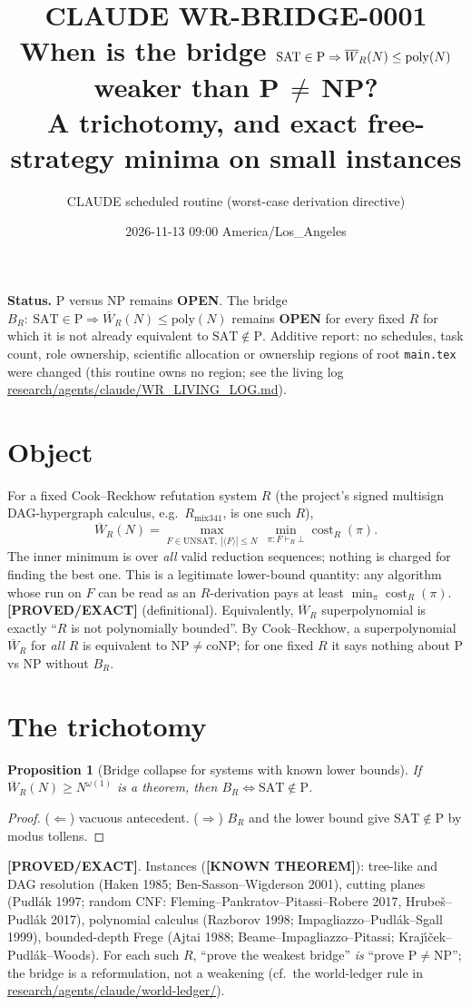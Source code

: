 \documentclass[11pt]{article}
\title{CLAUDE WR-BRIDGE-0001\\[2pt]
\large When is the bridge $\SAT\in\mathrm P\Rightarrow\Wb_R(N)\le\mathrm{poly}(N)$
weaker than P\,$\neq$\,NP?\\ A trichotomy, and exact free-strategy minima on small instances}
\author{CLAUDE scheduled routine (worst-case derivation directive)}
\date{2026-11-13 09:00 America/Los\_Angeles}
\newtheorem{proposition}[theorem]{Proposition}
\theoremstyle{remark}
\newcommand{\SAT}{\mathrm{SAT}}
\newcommand{\UNSAT}{\mathrm{UNSAT}}
\newcommand{\Wb}{\overline W}
\newcommand{\status}[1]{\textbf{[#1]}}
\begin{document}
\maketitle

\noindent\textbf{Status.} P versus NP remains \textbf{OPEN}. The bridge
$B_R:\ \SAT\in\mathrm P\Rightarrow \Wb_R(N)\le\mathrm{poly}(N)$ remains \textbf{OPEN} for every
fixed $R$ for which it is not already equivalent to $\SAT\notin\mathrm P$. Additive report:
no schedules, task count, role ownership, scientific allocation or ownership regions of root
\texttt{main.tex} were changed (this routine owns no region; see the living log
\url{research/agents/claude/WR_LIVING_LOG.md}).

\section{Object}
For a fixed Cook--Reckhow refutation system $R$ (the project's signed multisign DAG-hypergraph
calculus, e.g.\ $R_{\mathrm{mix341}}$, is one such $R$),
\[
\Wb_R(N)=\max_{F\in\UNSAT,\ |\langle F\rangle|\le N}\ \min_{\pi:F\vdash_R\bot}\operatorname{cost}_R(\pi).
\]
The inner minimum is over \emph{all} valid reduction sequences; nothing is charged for finding the
best one. This is a legitimate lower-bound quantity: any algorithm whose run on $F$ can be read
as an $R$-derivation pays at least $\min_\pi\operatorname{cost}_R(\pi)$. \status{PROVED/EXACT}
(definitional). Equivalently, $\Wb_R$ superpolynomial is exactly ``$R$ is not polynomially
bounded''. By Cook--Reckhow, a superpolynomial $\Wb_R$ for \emph{all} $R$ is equivalent to
$\mathrm{NP}\neq\mathrm{coNP}$; for one fixed $R$ it says nothing about P vs NP without $B_R$.

\section{The trichotomy}
\begin{proposition}[Bridge collapse for systems with known lower bounds]\label{p:collapse}
If $\Wb_R(N)\ge N^{\omega(1)}$ is a theorem, then $B_R\iff\SAT\notin\mathrm P$.
\end{proposition}
\begin{proof}
($\Leftarrow$) vacuous antecedent. ($\Rightarrow$) $B_R$ and the lower bound give
$\SAT\notin\mathrm P$ by modus tollens.
\end{proof}
\status{PROVED/EXACT}. Instances (\status{KNOWN THEOREM}): tree-like and DAG resolution
(Haken 1985; Ben-Sasson--Wigderson 2001), cutting planes (Pudl\'ak 1997; random CNF:
Fleming--Pankratov--Pitassi--Robere 2017, Hrube\v{s}--Pudl\'ak 2017), polynomial calculus
(Razborov 1998; Impagliazzo--Pudl\'ak--Sgall 1999), bounded-depth Frege (Ajtai 1988;
Beame--Impagliazzo--Pitassi; Kraj\'\i\v{c}ek--Pudl\'ak--Woods). For each such $R$, ``prove the
weakest bridge'' \emph{is} ``prove P$\neq$NP''; the bridge is a reformulation, not a weakening
(cf.\ the world-ledger rule in \url{research/agents/claude/world-ledger/}).
\end{document}
